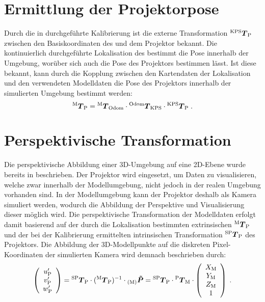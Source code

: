 \section{Ermittlung der Projektorpose}
Durch die in  durchgeführte Kalibrierung ist die externe Transformation ${^{\mathrm{KPS}}\mbox{\boldmath{$T$}}_{\mathrm{P}}}$ zwischen den Basiskoordinaten des  und dem Projektor bekannt. Die kontinuierlich durchgeführte Lokalisation des  bestimmt die Pose innerhalb der Umgebung, worüber sich auch die Pose des Projektors bestimmen lässt. Ist diese bekannt, kann durch die Kopplung zwischen den Kartendaten der Lokalisation und den verwendeten Modelldaten die Pose des Projektors innerhalb der simulierten Umgebung bestimmt werden:
%
\begin{equation}
{^{\mathrm{M}}\mbox{\boldmath{$T$}}_{\mathrm{P}}} = {^{\mathrm{M}}\mbox{\boldmath{$T$}}_{\mathrm{Odom}}} \cdot {^{\mathrm{Odom}}\mbox{\boldmath{$T$}}_{\mathrm{KPS}}} \cdot {^{\mathrm{KPS}}\mbox{\boldmath{$T$}}_{\mathrm{P}}} \; \text{.}
\end{equation}

\section{Perspektivische Transformation}
Die perspektivische Abbildung einer 3D-Umgebung auf eine 2D-Ebene wurde bereits in  beschrieben. Der Projektor wird eingesetzt, um Daten zu visualisieren, welche zwar innerhalb der Modellumgebung, nicht jedoch in der realen Umgebung vorhanden sind. In der Modellumgebung kann der Projektor deshalb als Kamera simuliert werden, wodurch die Abbildung der Perspektive und Visualisierung dieser möglich wird. Die perspektivische Transformation der Modelldaten erfolgt damit basierend auf der durch die Lokalisation bestimmten extrinsischen ${^{\mathrm{M}}\mbox{\boldmath{$T$}}_{\mathrm{P}}}$ und der bei der Kalibrierung ermittelten intrinsischen Transformation ${^{\mathrm{SP}}\mbox{\boldmath{$T$}}_{\mathrm{P}}}$ des Projektors. Die Abbildung der 3D-Modellpunkte auf die diskreten Pixel-Koordinaten der simulierten Kamera wird demnach beschrieben durch:
%
\begin{equation}
\mat{c}{
u_{\ind{P}}'\\
v_{\ind{P}}'\\
w_{\ind{P}}'
}
= \tmat{SP}{P} \cdot (\tmat{M}{P})^{-1} \cdot \ve{M}{\tilde{P}} = \tmat{SP}{P} \cdot \tmat{P}{M} \cdot 
\mat{c}{
X_{\ind{M}}\\
Y_{\ind{M}}\\
Z_{\ind{M}}\\
1
}
\; \text{.}
\label{eq.proj_trans}
\end{equation}


